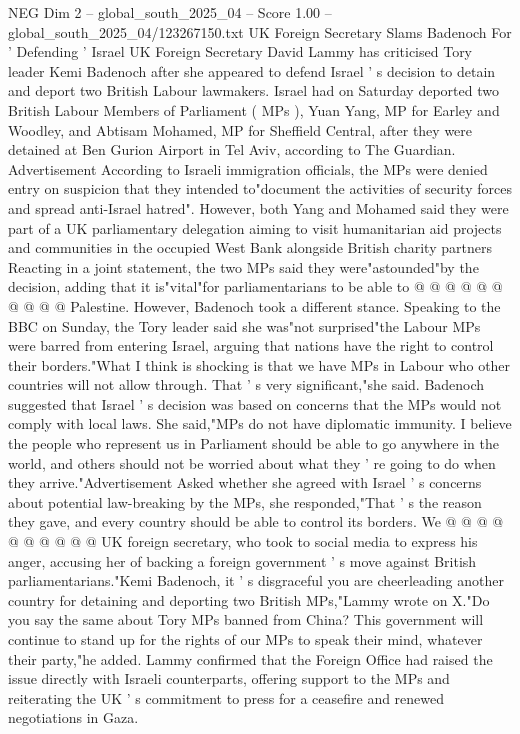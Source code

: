 \begin{textsample}{NEG Dim 2 – global\_south\_2025\_04 – Score 1.00 – global\_south\_2025\_04/123267150.txt}  \label{ex:f2_neg_103}
UK Foreign Secretary Slams Badenoch For ' Defending ' Israel UK Foreign Secretary David Lammy has criticised Tory leader Kemi Badenoch after she appeared to defend Israel ' s decision to detain and deport two British Labour lawmakers.
Israel had on Saturday deported two British Labour Members of Parliament ( MPs ), Yuan Yang, MP for Earley and Woodley, and Abtisam Mohamed, MP for Sheffield Central, after they were detained at Ben Gurion Airport in Tel Aviv, according to The Guardian.
Advertisement According to Israeli immigration officials, the MPs were denied entry on suspicion that they intended to"document the activities of security forces and spread anti-Israel hatred".
However, both Yang and Mohamed said they were part of a UK parliamentary delegation aiming to visit humanitarian aid projects and communities in the occupied West Bank alongside British charity partners Reacting in a joint statement, the two MPs said they were"astounded"by the decision, adding that it is"vital"for parliamentarians to be able to @ @ @ @ @ @ @ @ @ @ Palestine.
However, Badenoch took a different stance.
Speaking to the BBC on Sunday, the Tory leader said she was"not surprised"the Labour MPs were barred from entering Israel, arguing that nations have the right to control their borders."What I think is shocking is that we have MPs in Labour who other countries will not allow through.
That ' s very significant,"she said.
Badenoch suggested that Israel ' s decision was based on concerns that the MPs would not comply with local laws.
She said,"MPs do not have diplomatic immunity.
I believe the people who represent us in Parliament should be able to go anywhere in the world, and others should not be worried about what they ' re going to do when they arrive."Advertisement Asked whether she agreed with Israel ' s concerns about potential law-breaking by the MPs, she responded,"That ' s the reason they gave, and every country should be able to control its borders.
We @ @ @ @ @ @ @ @ @ @ UK foreign secretary, who took to social media to express his anger, accusing her of backing a foreign government ' s move against British parliamentarians."Kemi Badenoch, it ' s disgraceful you are cheerleading another country for detaining and deporting two British MPs,"Lammy wrote on X."Do you say the same about Tory MPs banned from China?
This government will continue to stand up for the rights of our MPs to speak their mind, whatever their party,"he added.
Lammy confirmed that the Foreign Office had raised the issue directly with Israeli counterparts, offering support to the MPs and reiterating the UK ' s commitment to press for a ceasefire and renewed negotiations in Gaza.

\end{textsample}
